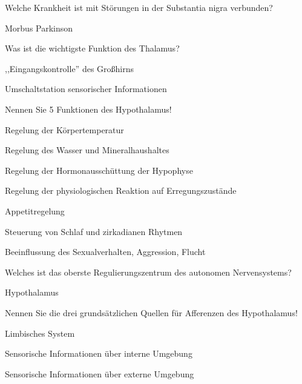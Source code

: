 \documentclass[10pt, a4paper]{exam}
\begin{document}
\begin{questions}
  \question Welche Krankheit ist mit Störungen in der Substantia nigra verbunden?
  \begin{solution}
    Morbus Parkinson
  \end{solution}

  \question Was ist die wichtigste Funktion des Thalamus?
  \begin{solution}
    \begin{itemize*}
      \item ,,Eingangskontrolle'' des Großhirns
      \item Umschaltstation sensorischer Informationen
    \end{itemize*}
  \end{solution}

  \question Nennen Sie 5 Funktionen des Hypothalamus!
  \begin{solution}
    \begin{itemize*}
      \item Regelung der Körpertemperatur
      \item Regelung des Wasser und Mineralhaushaltes
      \item Regelung der Hormonausschüttung der Hypophyse
      \item Regelung der physiologischen Reaktion auf Erregungszustände
      \item Appetitregelung
      \item Steuerung von Schlaf und zirkadianen Rhytmen
      \item Beeinflussung des Sexualverhalten, Aggression, Flucht
    \end{itemize*}
  \end{solution}

  \question Welches ist das oberste Regulierungszentrum des autonomen Nervensystems?
  \begin{solution}
    Hypothalamus
  \end{solution}

  \question Nennen Sie die drei grundsätzlichen Quellen für Afferenzen des Hypothalamus!
  \begin{solution}
    \begin{itemize*}
      \item Limbisches System
      \item Sensorische Informationen über interne Umgebung
      \item Sensorische Informationen über externe Umgebung
    \end{itemize*}
  \end{solution}


\end{questions}
\end{document}
